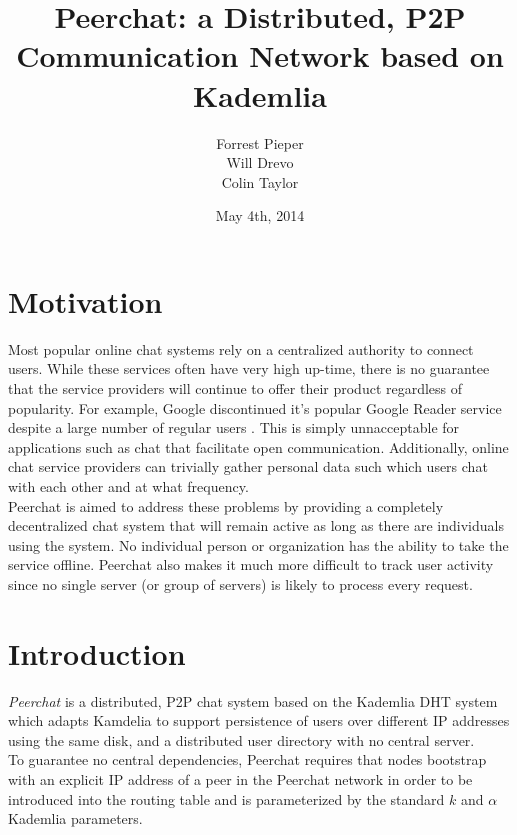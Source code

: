 \documentclass{article}
\title{Peerchat: a Distributed, P2P Communication Network based on Kademlia}
\author{
  Forrest Pieper\\
  Will Drevo\\
  Colin Taylor
}
\date{May 4th, 2014}
\begin{document}
\maketitle

\section{Motivation}
\label{Motivation}

Most popular online chat systems rely on a centralized authority to connect users. While these services often have very high up-time, there is no guarantee that the service providers will continue to offer their product regardless of popularity. For example, Google discontinued it's popular Google Reader service despite a large number of regular users \cite{Green13}. This is simply unnacceptable for applications such as chat that facilitate open communication. Additionally, online chat service providers can trivially gather personal data such which users chat with each other and at what frequency. \\ 


Peerchat is aimed to address these problems by providing a completely decentralized chat system that will remain active as long as there are individuals using the system. No individual person or organization has the ability to take the service offline. Peerchat also makes it much more difficult to track user activity since no single server (or group of servers) is likely to process every request.  


\section{Introduction}

\textit{Peerchat} is a distributed, P2P chat system based on the Kademlia DHT \cite{Maymounkov02} system which adapts Kamdelia to support persistence of users over different IP addresses using the same disk, and a distributed user directory with no central server. \\

To guarantee no central dependencies, Peerchat requires that nodes bootstrap with an explicit IP address of a peer in the Peerchat network in order to be introduced into the routing table and is parameterized by the standard $k$ and $\alpha$ Kademlia parameters. \\
\end{document}
